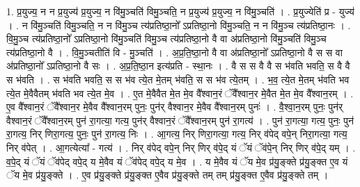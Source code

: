 \documentclass[17pt]{extarticle}
\begin{document}
1. प्र॒युज्य॒ न न प्र॒युज्य॑ प्र॒युज्य॒ न वि॑मु॒ञ्चति॑ विमु॒ञ्चति॒ न प्र॒युज्य॑ प्र॒युज्य॒ न वि॑मु॒ञ्चति॑ । . प्र॒युज्येति॑ प्र - युज्य॑ । . न वि॑मु॒ञ्चति॑ विमु॒ञ्चति॒ न न वि॑मु॒ञ्च त्य॑प्रतिष्ठा॒नो᳚ ऽप्रतिष्ठा॒नो वि॑मु॒ञ्चति॒ न न वि॑मु॒ञ्च त्य॑प्रतिष्ठा॒नः । . वि॒मु॒ञ्च त्य॑प्रतिष्ठा॒नो᳚ ऽप्रतिष्ठा॒नो वि॑मु॒ञ्चति॑ विमु॒ञ्च त्य॑प्रतिष्ठा॒नो वै वा अ॑प्रतिष्ठा॒नो वि॑मु॒ञ्चति॑ विमु॒ञ्च त्य॑प्रतिष्ठा॒नो वै । . वि॒मु॒ञ्चतीति॑ वि - मु॒ञ्चति॑ । . अ॒प्र॒ति॒ष्ठा॒नो वै वा अ॑प्रतिष्ठा॒नो᳚ ऽप्रतिष्ठा॒नो वै स स वा अ॑प्रतिष्ठा॒नो᳚ ऽप्रतिष्ठा॒नो वै सः । . अ॒प्र॒ति॒ष्ठा॒न इत्य॑प्रति - स्था॒नः । . वै स स वै वै स भ॑वति भवति॒ स वै वै स भ॑वति । . स भ॑वति भवति॒ स स भ॑व त्ये॒त मे॒तम् भ॑वति॒ स स भ॑व त्ये॒तम् । . भ॒व॒ त्ये॒त मे॒तम् भ॑वति भव त्ये॒त मे॒वैवैतम् भ॑वति भव त्ये॒त मे॒व । . ए॒त मे॒वैवैत मे॒त मे॒व वै᳚श्वान॒रं ॅवै᳚श्वान॒र मे॒वैत मे॒त मे॒व वै᳚श्वान॒रम् । . ए॒व वै᳚श्वान॒रं ॅवै᳚श्वान॒र मे॒वैव वै᳚श्वान॒रम् पुनः॒ पुन॑र् वैश्वान॒र मे॒वैव वै᳚श्वान॒रम् पुनः॑ । . वै॒श्वा॒न॒रम् पुनः॒ पुन॑र् वैश्वान॒रं ॅवै᳚श्वान॒रम् पुन॑ रा॒गत्या॒ गत्य॒ पुन॑र् वैश्वान॒रं ॅवै᳚श्वान॒रम् पुन॑ रा॒गत्य॑ । . पुन॑ रा॒गत्या॒ गत्य॒ पुनः॒ पुन॑ रा॒गत्य॒ निर् णिरा॒गत्य॒ पुनः॒ पुन॑ रा॒गत्य॒ निः । . आ॒गत्य॒ निर् णिरा॒गत्या॒ गत्य॒ निर् व॑पेद् वपे॒न् निरा॒गत्या॒ गत्य॒ निर् व॑पेत् । . आ॒गत्येत्या᳚ - गत्य॑ । . निर् व॑पेद् वपे॒न् निर् णिर् व॑पे॒द् यं ॅयं ॅव॑पे॒न् निर् णिर् व॑पे॒द् यम् । . व॒पे॒द् यं ॅयं ॅव॑पेद् वपे॒द् य मे॒वैव यं ॅव॑पेद् वपे॒द् य मे॒व । . य मे॒वैव यं ॅय मे॒व प्र॑यु॒ङ्क्ते प्र॑यु॒ङ्क्त ए॒व यं ॅय मे॒व प्र॑यु॒ङ्क्ते । . ए॒व प्र॑यु॒ङ्क्ते प्र॑यु॒ङ्क्त ए॒वैव प्र॑यु॒ङ्क्ते तम् तम् प्र॑यु॒ङ्क्त ए॒वैव प्र॑यु॒ङ्क्ते तम् । \newline
\end{document}
